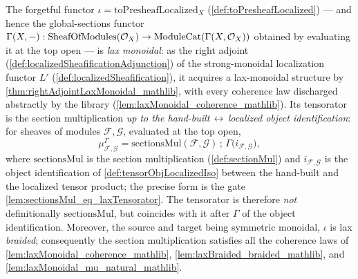 \begin{lemma}
  \label{lem:sectionsFunctor_laxMonoidal}
  The forgetful functor \(\iota = \mathrm{toPresheafLocalized}_X\)
  (\cref{def:toPresheafLocalized}) --- and hence the global-sections functor
  \(\Gamma(X,-) : \mathrm{SheafOfModules}(\mathcal{O}_X) \to
  \mathrm{ModuleCat}(\Gamma(X,\mathcal{O}_X))\) obtained by evaluating it at the top
  open --- is \emph{lax monoidal}: as the right adjoint
  (\cref{def:localizedSheafificationAdjunction}) of the strong-monoidal
  localization functor \(L'\) (\cref{def:localizedSheafification}), it acquires a
  lax-monoidal structure by \cref{thm:rightAdjointLaxMonoidal_mathlib}, with every
  coherence law discharged abstractly by the library
  (\cref{lem:laxMonoidal_coherence_mathlib}). Its tensorator is the section
  multiplication \emph{up to the hand-built\,\(\leftrightarrow\)\,localized object
  identification}: for sheaves of modules \(\mathcal{F},\mathcal{G}\), evaluated at
  the top open,
  \[
    \mu^{\Gamma}_{\mathcal{F},\mathcal{G}} =
      \mathrm{sectionsMul}(\mathcal{F},\mathcal{G}) \,;\,
      \Gamma\bigl(i_{\mathcal{F},\mathcal{G}}\bigr),
  \]
  where \(\mathrm{sectionsMul}\) is the section multiplication
  (\cref{def:sectionMul}) and \(i_{\mathcal{F},\mathcal{G}}\) is the object
  identification of \cref{def:tensorObjLocalizedIso} between the hand-built and the
  localized tensor product; the precise form is the gate
  \cref{lem:sectionsMul_eq_laxTensorator}. The tensorator is therefore \emph{not}
  definitionally \(\mathrm{sectionsMul}\), but coincides with it after \(\Gamma\) of
  the object identification. Moreover, the source and target being symmetric
  monoidal, \(\iota\) is lax \emph{braided}; consequently the section multiplication
  satisfies all the coherence laws of \cref{lem:laxMonoidal_coherence_mathlib},
  \cref{lem:laxBraided_braided_mathlib}, and
  \cref{lem:laxMonoidal_mu_natural_mathlib}.
\end{lemma}

